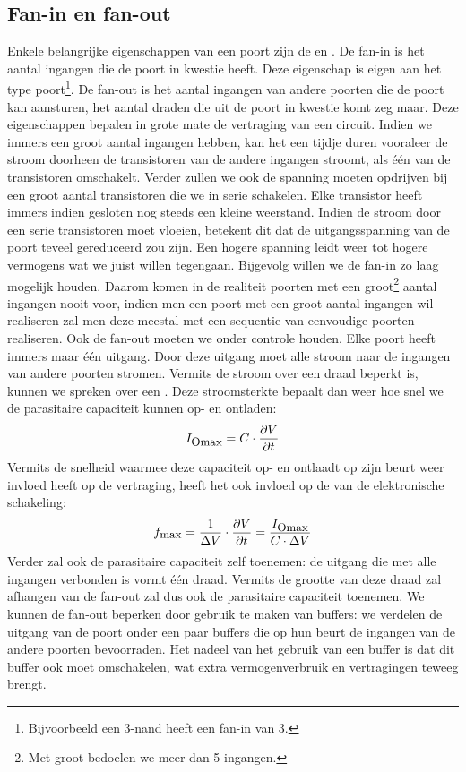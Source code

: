 \subsection{Fan-in en fan-out}
Enkele belangrijke eigenschappen van een poort zijn de  en . De fan-in is het aantal ingangen die de poort in kwestie heeft. Deze eigenschap is eigen aan het type poort\footnote{Bijvoorbeeld een 3-nand heeft een fan-in van 3.}. De fan-out is het aantal ingangen van andere poorten die de poort kan aansturen, het aantal draden die uit de poort in kwestie komt zeg maar. Deze eigenschappen bepalen in grote mate de vertraging van een circuit. Indien we immers een groot aantal ingangen hebben, kan het een tijdje duren vooraleer de stroom doorheen de transistoren van de andere ingangen stroomt, als \'e\'en van de transistoren omschakelt. Verder zullen we ook de spanning moeten opdrijven bij een groot aantal transistoren die we in serie schakelen. Elke transistor heeft immers indien gesloten nog steeds een kleine weerstand. Indien de stroom door een serie transistoren moet vloeien, betekent dit dat de uitgangsspanning van de poort teveel gereduceerd zou zijn. Een hogere spanning leidt weer tot hogere vermogens wat we juist willen tegengaan. Bijgevolg willen we de fan-in zo laag mogelijk houden. Daarom komen in de realiteit poorten met een groot\footnote{Met groot bedoelen we meer dan 5 ingangen.} aantal ingangen nooit voor, indien men een poort met een groot aantal ingangen wil realiseren zal men deze meestal met een sequentie van eenvoudige poorten realiseren. Ook de fan-out moeten we onder controle houden. Elke poort heeft immers maar \'e\'en uitgang. Door deze uitgang moet alle stroom naar de ingangen van andere poorten stromen. Vermits de stroom over een draad beperkt is, kunnen we spreken over een . Deze stroomsterkte bepaalt dan weer hoe snel we de parasitaire capaciteit kunnen op- en ontladen:
\begin{equation}
I_{\mbox{\small{Omax}}}=C\cdot\displaystyle\frac{\partial V}{\partial t}
\end{equation}
Vermits de snelheid waarmee deze capaciteit op- en ontlaadt op zijn beurt weer invloed heeft op de vertraging, heeft het ook invloed op de  van de elektronische schakeling:
\begin{equation}
f_{\mbox{\small{max}}}=\displaystyle\frac{1}{\Delta V}\cdot\displaystyle\frac{\partial V}{\partial t}=\displaystyle\frac{I_{\mbox{\small{Omax}}}}{C\cdot \Delta V}
\end{equation}
Verder zal ook de parasitaire capaciteit zelf toenemen: de uitgang die met alle ingangen verbonden is vormt \'e\'en draad. Vermits de grootte van deze draad zal afhangen van de fan-out zal dus ook de parasitaire capaciteit toenemen. We kunnen de fan-out beperken door gebruik te maken van buffers: we verdelen de uitgang van de poort onder een paar buffers die op hun beurt de ingangen van de andere poorten bevoorraden. Het nadeel van het gebruik van een buffer is dat dit buffer ook moet omschakelen, wat extra vermogenverbruik en vertragingen teweeg brengt.
